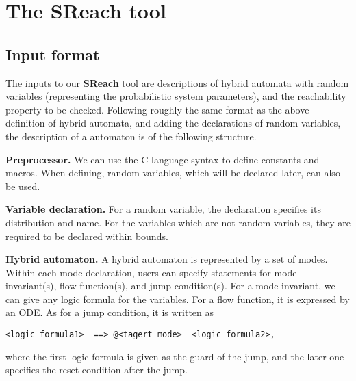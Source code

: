 \section{The SReach tool}
\subsection{Input format}
The inputs to our {\bf SReach} tool are descriptions of hybrid automata with random variables (representing the probabilistic system parameters), and the reachability property to be checked. Following roughly the same format as the above definition of hybrid automata, and adding the declarations of random variables, the description of a automaton is of the following structure.

{\bf Preprocessor.} We can use the C language syntax to define constants and macros. When defining, random variables, which will be declared later, can also be used. 

\begin{comment}
For example, we can write,\\

$\#define\;\; x \;\;2.0$\\
$\#define\;\; y\;\; (z^2 \;+\; 1)$\\

where $z$ can be a random variable.\\
\end{comment}

{\bf Variable declaration.} For a random variable, the declaration specifies its distribution and name. For the variables which are not random variables, they are required to be declared within bounds. 
\begin{comment}
with the format - $Dist \; \; var_nam;$, where currently "$Dist$" can be "$B(p)$" (Bernoulli distribution), "$U(p, \;q)$" (Uniform distribution), "$N(p, \;q)$" (Gaussian distribution), and "$E(p)$" (Exponential distribution). $p$ and $q$ are parameters for these distributions. (Note: it is easy to include additional distributions if needed.)

For instance,\\
$[-10, \; 20.1]\; \;  x;$\\
\end{comment}

{\bf Hybrid automaton.} A hybrid automaton is represented by a set of modes. Within each mode declaration, users can specify statements for mode invariant(s), flow function(s), and jump condition(s). For a mode invariant, we can give any logic formula for the variables. For a flow function, it is expressed by an ODE.  As for a jump condition, it is written as 
\begin{verbatim} 
<logic_formula1>  ==> @<tagert_mode>  <logic_formula2>,
\end{verbatim}
where the first logic formula is given as the guard of the jump, and the later one specifies the reset condition after the jump.

